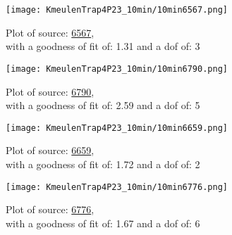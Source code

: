 \documentclass{article}
\begin{document}
\begin{figure}[H]
    \centering
    \begin{minipage}{.5\textwidth}
        \centering
        \texttt{[image: KmeulenTrap4P23\_10min/10min6567.png]}
        \captionsetup{labelformat=empty}
        \caption{Plot of source: \href{http://banana.transientskp.org/r4/vlo_KmeulenTrap4P23/runningcatalog/6567}{6567},\\with a goodness of fit of: 1.31 and a dof of: 3}
        \addtocounter{figure}{-1}
        \label{KmeulenTrap4P23:10min:6567:plot}
    \end{minipage}%
    \begin{minipage}{0.5\textwidth}
        \centering

        \texttt{[image: KmeulenTrap4P23\_10min/10min6790.png]}
        \captionsetup{labelformat=empty}
        \caption{Plot of source: \href{http://banana.transientskp.org/r4/vlo_KmeulenTrap4P23/runningcatalog/6790}{6790},\\with a goodness of fit of: 2.59 and a dof of: 5}
    \addtocounter{figure}{-1}
    \label{KmeulenTrap4P23:10min:6790:plot}
    \end{minipage}
\end{figure}
\begin{figure}[H]
    \centering
    \begin{minipage}{.5\textwidth}
        \centering
        \texttt{[image: KmeulenTrap4P23\_10min/10min6659.png]}
        \captionsetup{labelformat=empty}
        \caption{Plot of source: \href{http://banana.transientskp.org/r4/vlo_KmeulenTrap4P23/runningcatalog/6659}{6659},\\with a goodness of fit of: 1.72 and a dof of: 2}
        \addtocounter{figure}{-1}
        \label{KmeulenTrap4P23:10min:6659:plot}
    \end{minipage}%
    \begin{minipage}{0.5\textwidth}
        \centering

        \texttt{[image: KmeulenTrap4P23\_10min/10min6776.png]}
        \captionsetup{labelformat=empty}
        \caption{Plot of source: \href{http://banana.transientskp.org/r4/vlo_KmeulenTrap4P23/runningcatalog/6776}{6776},\\with a goodness of fit of: 1.67 and a dof of: 6}
    \addtocounter{figure}{-1}
    \label{KmeulenTrap4P23:10min:6776:plot}
    \end{minipage}
\end{figure}
\end{document}

